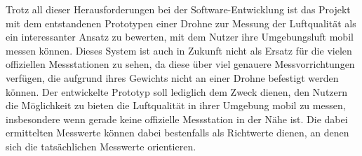 \newline \newline
Trotz all dieser Herausforderungen bei der Software-Entwicklung ist das Projekt mit dem entstandenen Prototypen einer Drohne zur Messung der Luftqualität als ein interessanter Ansatz zu bewerten, mit dem Nutzer ihre Umgebungsluft mobil messen können. Dieses System ist auch in Zukunft nicht als Ersatz für die vielen offiziellen Messstationen zu sehen, da diese über viel genauere Messvorrichtungen verfügen, die aufgrund ihres Gewichts nicht an einer Drohne befestigt werden können. \newline
Der entwickelte Prototyp soll lediglich dem Zweck dienen, den Nutzern die Möglichkeit zu bieten die Luftqualität in ihrer Umgebung mobil zu messen, insbesondere wenn gerade keine offizielle Messstation in der Nähe ist. Die dabei ermittelten Messwerte können dabei bestenfalls als Richtwerte dienen, an denen sich die tatsächlichen Messwerte orientieren.